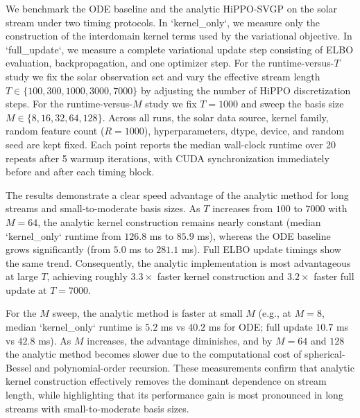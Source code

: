 We benchmark the ODE baseline and the analytic HiPPO-SVGP on the solar stream under two timing protocols. In `kernel_only`, we measure only the construction of the interdomain kernel terms used by the variational objective. In `full_update`, we measure a complete variational update step consisting of ELBO evaluation, backpropagation, and one optimizer step. For the runtime-versus-$T$ study we fix the solar observation set and vary the effective stream length $T \in \{100, 300, 1000, 3000, 7000\}$ by adjusting the number of HiPPO discretization steps. For the runtime-versus-$M$ study we fix $T=1000$ and sweep the basis size $M \in \{8, 16, 32, 64, 128\}$. Across all runs, the solar data source, kernel family, random feature count ($R=1000$), hyperparameters, dtype, device, and random seed are kept fixed. Each point reports the median wall-clock runtime over 20 repeats after 5 warmup iterations, with CUDA synchronization immediately before and after each timing block.

The results demonstrate a clear speed advantage of the analytic method for long streams and small-to-moderate basis sizes. As $T$ increases from $100$ to $7000$ with $M=64$, the analytic kernel construction remains nearly constant (median `kernel_only` runtime from $126.8$ ms to $85.9$ ms), whereas the ODE baseline grows significantly (from $5.0$ ms to $281.1$ ms). Full ELBO update timings show the same trend. Consequently, the analytic implementation is most advantageous at large $T$, achieving roughly $3.3\times$ faster kernel construction and $3.2\times$ faster full update at $T=7000$.

For the $M$ sweep, the analytic method is faster at small $M$ (e.g., at $M=8$, median `kernel_only` runtime is $5.2$ ms vs $40.2$ ms for ODE; full update $10.7$ ms vs $42.8$ ms). As $M$ increases, the advantage diminishes, and by $M=64$ and $128$ the analytic method becomes slower due to the computational cost of spherical-Bessel and polynomial-order recursion. These measurements confirm that analytic kernel construction effectively removes the dominant dependence on stream length, while highlighting that its performance gain is most pronounced in long streams with small-to-moderate basis sizes.

\caption{Runtime versus stream length $T$ on the solar benchmark. The top panel shows `kernel_only` timing; the bottom panel shows full ELBO update. Analytic HiPPO-SVGP maintains nearly constant runtime as $T$ grows, while ODE baseline runtime increases strongly. Points report median over 20 repeats after 5 warmup iterations; shaded bands denote one standard deviation.}

\caption{Runtime versus basis size $M$ on the solar benchmark ($T=1000$). Top panel measures kernel construction only; bottom panel measures one full ELBO update. Analytic HiPPO-SVGP is faster at small $M$, with a crossover around $M \approx 32$, and becomes slower than the ODE baseline at $M=64$ and $128$. Points show median over 20 repeats; shaded bands denote one standard deviation.}